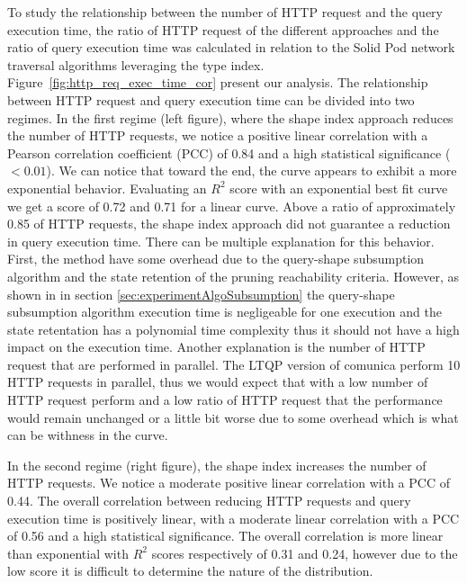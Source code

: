 To study the relationship between the number of HTTP request and the query execution time, the ratio of HTTP request of the different approaches and the ratio of query execution time was 
calculated in relation to the Solid Pod network traversal algorithms leveraging the type index.
Figure~\ref{fig:http_req_exec_time_cor} present our analysis.
The relationship between HTTP request and query execution time can be divided into two regimes.
In the first regime (left figure), where the shape index approach reduces the number of HTTP requests, we notice a positive linear correlation with a Pearson correlation coefficient (PCC) of 0.84 and a high statistical significance ($< 0.01$).
We can notice that toward the end, the curve appears to exhibit a more exponential behavior.
Evaluating an $R^2$ score with an exponential best fit curve we get a score of 0.72 and 0.71 for a linear curve.
Above a ratio of approximately 0.85 of HTTP requests, the shape index approach did not guarantee a reduction in query execution time.
There can be multiple explanation for this behavior.
First, the method have some overhead due to the query-shape subsumption algorithm and the state retention of the pruning reachability criteria.
However, as shown in in section \ref{sec:experimentAlgoSubsumption} the query-shape subsumption algorithm execution time is negligeable for one execution and the state retentation has a polynomial time complexity thus it should not have a high impact on the execution time.
Another explanation is the number of HTTP request that are performed in parallel.
The LTQP version of comunica perform 10 HTTP requests in parallel, thus we would expect that with a low number of HTTP request perform and a low ratio of HTTP request that the performance would remain unchanged or a little bit worse due to some overhead which is what 
can be withness in the curve.

In the second regime (right figure), the shape index increases the number of HTTP requests.
We notice a moderate positive linear correlation with a PCC of 0.44.
The overall correlation between reducing HTTP requests and query execution time is positively linear, with a moderate linear correlation with a PCC of 0.56 and a high statistical significance.
The overall correlation is more linear than exponential with $R^2$ scores respectively of 0.31 and 0.24, however due to the low score it is difficult to determine the nature of the distribution.


